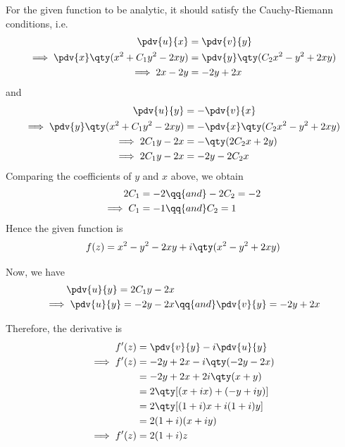\begin{enumerate}
			For the given function to be analytic, it should satisfy the Cauchy-Riemann conditions, i.e.
			\begin{align*}
				\pdv{u}{x}&=\pdv{v}{y} \\
				\implies\pdv{x}\qty(x^2+C_1y^2-2xy)&=\pdv{y}\qty(C_2x^2-y^2+2xy) \\
				\implies 2x-2y&=-2y+2x
			\end{align*}
			and
			\begin{align*}
				\pdv{u}{y}&=-\pdv{v}{x} \\
				\implies\pdv{y}\qty(x^2+C_1y^2-2xy)&=-\pdv{x}\qty(C_2x^2-y^2+2xy) \\
				\implies 2C_1y-2x&=-\qty(2C_2x+2y) \\
				\implies 2C_1y-2x&=-2y-2C_2x
			\end{align*}
			Comparing the coefficients of $y$ and $x$ above, we obtain
			\begin{align*}
				2C_1=-2&\qq{and}-2C_2=-2 \\
				\implies C_1=-1&\qq{and}C_2=1
			\end{align*}
			Hence the given function is
			\begin{align*}
				f(z)=x^2-y^2-2xy+i\qty(x^2-y^2+2xy)
			\end{align*}
			
			Now, we have
			\begin{align*}
				\pdv{u}{y}=2C_1y-2x& \\
				\implies\pdv{u}{y}=-2y-2x&\qq{and}\pdv{v}{y}=-2y+2x
			\end{align*}
			
			Therefore, the derivative is
			\begin{align*}
				f'(z)&=\pdv{v}{y}-i\pdv{u}{y} \\
				\implies f'(z)&=-2y+2x-i\qty(-2y-2x) \\
					&=-2y+2x+2i\qty(x+y) \\
					&=2\qty[(x+ix)+(-y+iy)] \\
					&=2\qty[(1+i)x+i(1+i)y] \\
					&=2(1+i)(x+iy) \\
				\implies f'(z)&=2(1+i)z
			\end{align*}
			
		\end{enumerate}